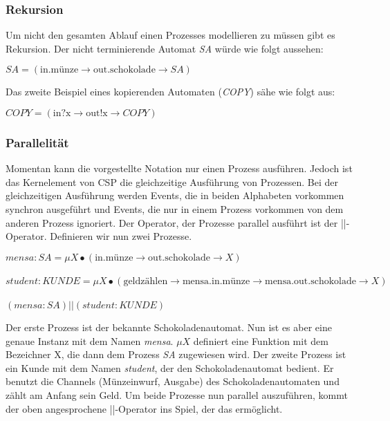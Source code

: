 \subsubsection{Rekursion}
Um nicht den gesamten Ablauf einen Prozesses modellieren zu müssen gibt es Rekursion. Der nicht terminierende Automat \textit{SA} würde wie folgt aussehen:
\begin{addmargin}[1cm]{0cm}
$SA = (\text{in.münze} \rightarrow \text{out.schokolade} \rightarrow SA)$
\end{addmargin}

Das zweite Beispiel eines kopierenden Automaten (\textit{COPY}) sähe wie folgt aus:

\begin{addmargin}[1cm]{0cm}
$COPY = (\text{in?x} \rightarrow \text{out!x} \rightarrow COPY)$
\end{addmargin}

\subsubsection{Parallelität}
Momentan kann die vorgestellte Notation nur einen Prozess ausführen. Jedoch ist das Kernelement von \ac{CSP} die gleichzeitige Ausführung von Prozessen. Bei der gleichzeitigen Ausführung werden Events, die in beiden Alphabeten vorkommen synchron ausgeführt und Events, die nur in einem Prozess vorkommen von dem anderen Prozess ignoriert. Der Operator, der Prozesse parallel ausführt ist der ||-Operator. Definieren wir nun zwei Prozesse.

\begin{addmargin}[1cm]{0cm}
$mensa:SA = \mu X \bullet (\text{in.münze} \rightarrow \text{out.schokolade} \rightarrow X)$\\\\
$student:KUNDE = \mu X \bullet (\text{geldzählen} \rightarrow \text{mensa.in.münze} \rightarrow \text{mensa.out.schokolade} \rightarrow  X)$\\\\
$ (mensa:SA) || (student:KUNDE) $
\end{addmargin}

Der erste Prozess ist der bekannte Schokoladenautomat. Nun ist es aber eine genaue Instanz mit dem Namen \textit{mensa}. $\mu X$ definiert eine Funktion mit dem Bezeichner X, die dann dem Prozess \textit{SA} zugewiesen wird.
Der zweite Prozess ist ein Kunde mit dem Namen \textit{student}, der den Schokoladenautomat bedient. Er benutzt die Channels (Münzeinwurf, Ausgabe) des Schokoladenautomaten und zählt am Anfang sein Geld. Um beide Prozesse nun parallel auszuführen, kommt der oben angesprochene ||-Operator ins Spiel, der das ermöglicht.

